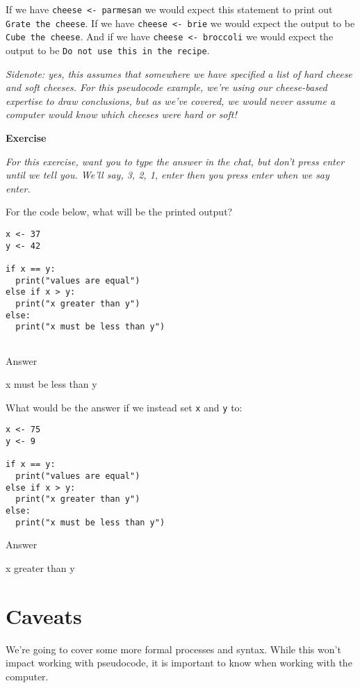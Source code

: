 \documentclass[
]{book}
\begin{document}
If we have \texttt{cheese\ \textless{}-\ parmesan} we would expect this statement to print out \texttt{Grate\ the\ cheese}. If we have \texttt{cheese\ \textless{}-\ brie} we would expect the output to be \texttt{Cube\ the\ cheese}. And if we have \texttt{cheese\ \textless{}-\ broccoli} we would expect the output to be \texttt{Do\ not\ use\ this\ in\ the\ recipe}.

\emph{Sidenote: yes, this assumes that somewhere we have specified a list of hard cheese and soft cheeses. For this pseudocode example, we're using our cheese-based expertise to draw conclusions, but as we've covered, we would never assume a computer would know which cheeses were hard or soft!}

\textbf{Exercise}

\emph{For this exercise, want you to type the answer in the chat, but don't press enter until we tell you. We'll say, \emph{3, 2, 1, enter} then you press enter when we say \emph{enter}.}

For the code below, what will be the printed output?

\begin{verbatim}
x <- 37
y <- 42

if x == y:
  print("values are equal")
else if x > y:
  print("x greater than y")
else:
  print("x must be less than y")
  
\end{verbatim}

Answer

x must be less than y

\hfill\break

What would be the answer if we instead set \texttt{x} and \texttt{y} to:

\begin{verbatim}
x <- 75
y <- 9

if x == y:
  print("values are equal")
else if x > y:
  print("x greater than y")
else:
  print("x must be less than y")
\end{verbatim}

Answer

x greater than y

\hfill\break

\section{Caveats}\label{caveats-1}

We're going to cover some more formal processes and syntax. While this won't impact working with pseudocode, it is important to know when working with the computer.
\end{document}
